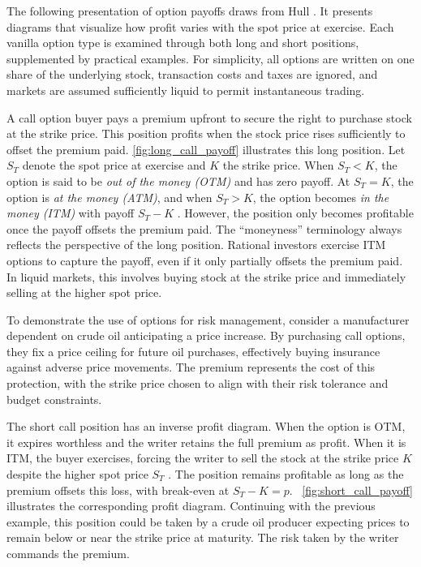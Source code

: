 \documentclass[english,12pt,a4paper,pdftex,sci,utf8]{aaltothesis}
\begin{document}
The following presentation of option payoffs draws from Hull \cite{hull2018}. It presents diagrams that visualize how profit varies with the spot price at exercise. Each vanilla option type is examined through both long and short positions, supplemented by practical examples. For simplicity, all options are written on one share of the underlying stock, transaction costs and taxes are ignored, and markets are assumed sufficiently liquid to permit instantaneous trading.

A call option buyer pays a premium upfront to secure the right to purchase stock at the strike price. This position profits when the stock price rises sufficiently to offset the premium paid. \cref{fig:long_call_payoff} illustrates this long position. Let $S_T$ denote the spot price at exercise and $K$ the strike price. When $S_T < K$, the option is said to be \emph{out of the money (OTM)} and has zero payoff. At $S_T = K$, the option is \emph{at the money (ATM)}, and when $S_T > K$, the option becomes \emph{in the money (ITM)} with payoff $S_T - K$ \cite{hull2018}. However, the position only becomes profitable once the payoff offsets the premium paid. The ``moneyness'' terminology always reflects the perspective of the long position. Rational investors exercise ITM options to capture the payoff, even if it only partially offsets the premium paid. In liquid markets, this involves buying stock at the strike price and immediately selling at the higher spot price.

To demonstrate the use of options for risk management, consider a manufacturer dependent on crude oil anticipating a price increase. By purchasing call options, they fix a price ceiling for future oil purchases, effectively buying insurance against adverse price movements. The premium represents the cost of this protection, with the strike price chosen to align with their risk tolerance and budget constraints.

The short call position has an inverse profit diagram. When the option is OTM, it expires worthless and the writer retains the full premium as profit. When it is ITM, the buyer exercises, forcing the writer to sell the stock at the strike price $K$ despite the higher spot price $S_T$ \cite{hull2018}. The position remains profitable as long as the premium offsets this loss, with break-even at $S_T - K = p$. ~\cref{fig:short_call_payoff} illustrates the corresponding profit diagram. Continuing with the previous example, this position could be taken by a crude oil producer expecting prices to remain below or near the strike price at maturity. The risk taken by the writer commands the premium.
\end{document}
